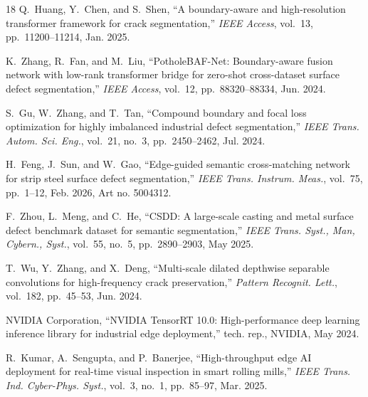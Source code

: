 \documentclass{ieeeaccess}
\begin{document}
\begin{thebibliography}{18}
Q.~Huang, Y.~Chen, and S.~Shen, ``A boundary-aware and high-resolution transformer framework for crack segmentation,'' \emph{IEEE Access}, vol.~13, pp.~11200--11214, Jan. 2025.

K.~Zhang, R.~Fan, and M.~Liu, ``PotholeBAF-Net: Boundary-aware fusion network with low-rank transformer bridge for zero-shot cross-dataset surface defect segmentation,'' \emph{IEEE Access}, vol.~12, pp.~88320--88334, Jun. 2024.

S.~Gu, W.~Zhang, and T.~Tan, ``Compound boundary and focal loss optimization for highly imbalanced industrial defect segmentation,'' \emph{IEEE Trans. Autom. Sci. Eng.}, vol.~21, no.~3, pp.~2450--2462, Jul. 2024.

H.~Feng, J.~Sun, and W.~Gao, ``Edge-guided semantic cross-matching network for strip steel surface defect segmentation,'' \emph{IEEE Trans. Instrum. Meas.}, vol.~75, pp.~1--12, Feb. 2026, Art no. 5004312.

F.~Zhou, L.~Meng, and C.~He, ``CSDD: A large-scale casting and metal surface defect benchmark dataset for semantic segmentation,'' \emph{IEEE Trans. Syst., Man, Cybern., Syst.}, vol.~55, no.~5, pp.~2890--2903, May 2025.

T.~Wu, Y.~Zhang, and X.~Deng, ``Multi-scale dilated depthwise separable convolutions for high-frequency crack preservation,'' \emph{Pattern Recognit. Lett.}, vol.~182, pp.~45--53, Jun. 2024.

NVIDIA Corporation, ``NVIDIA TensorRT 10.0: High-performance deep learning inference library for industrial edge deployment,'' tech. rep., NVIDIA, May 2024.

R.~Kumar, A.~Sengupta, and P.~Banerjee, ``High-throughput edge AI deployment for real-time visual inspection in smart rolling mills,'' \emph{IEEE Trans. Ind. Cyber-Phys. Syst.}, vol.~3, no.~1, pp.~85--97, Mar. 2025.
\end{thebibliography}

\EOD
\end{document}
